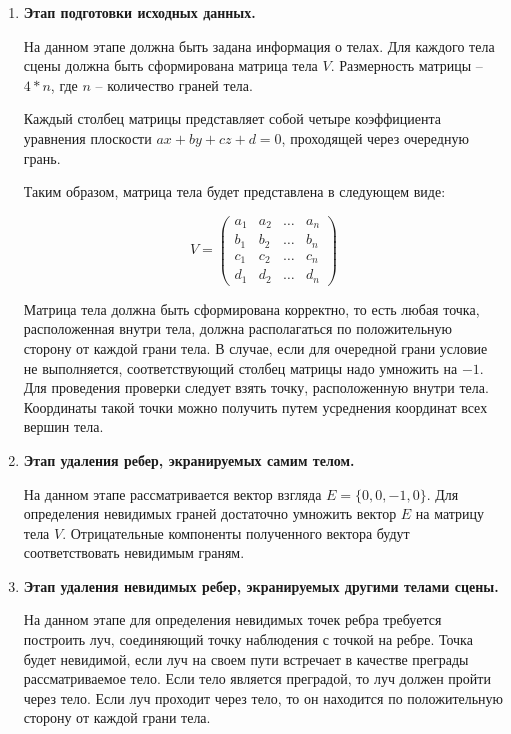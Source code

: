 \documentclass[a4paper,14pt, unknownkeysallowed]{extreport}
\begin{document}
\begin{enumerate}
	\item \textbf{Этап подготовки исходных данных.} 
	
	На данном этапе должна быть задана информация о телах. Для каждого тела сцены должна быть сформирована матрица тела $V$. Размерность матрицы -- $4 * n$, где $n$ -- количество граней тела.
	
	Каждый столбец матрицы представляет собой четыре коэффициента уравнения плоскости $ax + by + cz + d = 0$, проходящей через очередную грань.

	Таким образом, матрица тела будет представлена в следующем виде:

	\begin{equation}
		V = \begin{pmatrix}
			a_{1} & a_{2} & \ldots & a_{n}\\
			b_{1} & b_{2} & \ldots & b_{n}\\
			c_{1} & c_{2} & \ldots & c_{n}\\
			d_{1} & d_{2} & \ldots & d_{n}
		\end{pmatrix}
	\end{equation}

	Матрица тела должна быть сформирована корректно, то есть любая точка, расположенная внутри тела, должна располагаться по положительную сторону от каждой грани тела. В случае, если для очередной грани условие не выполняется, соответствующий столбец матрицы надо умножить на $-1$. Для проведения проверки следует взять точку, расположенную внутри тела. Координаты такой точки можно получить путем усреднения координат всех вершин тела.

	\item \textbf{Этап удаления ребер, экранируемых самим телом.} 
	
	На данном этапе рассматривается вектор взгляда $E = \{0, 0, -1, 0\}$.
	Для определения невидимых граней достаточно умножить вектор $E$ на матрицу тела $V$. Отрицательные компоненты полученного вектора будут соответствовать невидимым граням.

	\item \textbf{Этап удаления невидимых ребер, экранируемых другими телами сцены.}
	
	На данном этапе для определения невидимых точек ребра требуется построить луч, соединяющий точку наблюдения с точкой на ребре. Точка будет невидимой, если луч на своем пути встречает в качестве преграды рассматриваемое тело. Если тело является преградой, то луч должен пройти через тело. Если луч проходит через тело, то он находится по положительную сторону от каждой грани тела.
\end{enumerate}
\end{document}
